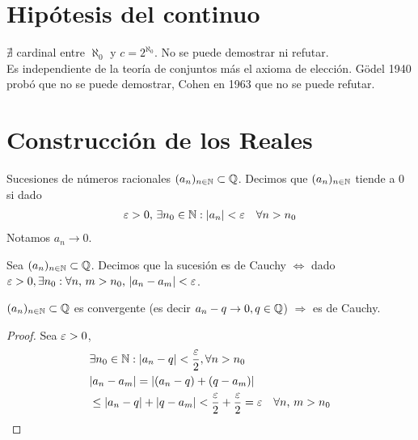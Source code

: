 \section{Hipótesis del continuo}

\(\nexists\) cardinal entre \(\aleph_0\) y \(c = 2^{\aleph_0} \). No se puede demostrar ni refutar. \\
Es independiente de la teoría de conjuntos más el axioma de elección.
Gödel 1940 probó que no se puede demostrar, Cohen en 1963 que no se puede refutar.

\section{Construcción de los Reales}

Sucesiones de números racionales \((a_n)_{n \in \mathbb{N}} \subset \mathbb{Q} \). Decimos que \((a_n)_{n \in \mathbb{N}} \) tiende a 0 si dado \begin{align*}
  \varepsilon > 0\text{, } \exists n_0 \in \mathbb{N} : |a_n| < \varepsilon \quad \forall n > n_0
\end{align*} Notamos \(a_n \to 0\).

\begin{definition}
  Sea \((a_n)_{n \in \mathbb{N}} \subset \mathbb{Q} \). Decimos que la sucesión es de Cauchy \(\iff \) dado \(\varepsilon > 0, \exists n_0 : \forall n\text{, }m > n_0\text{, } |a_n - a_m| < \varepsilon \).
\end{definition}

\begin{theorem}
  \((a_n)_{n \in \mathbb{N}} \subset \mathbb{Q} \) es convergente (es decir \(a_n - q \to 0, q \in \mathbb{Q} \)) \(\Rightarrow \) es de Cauchy.
  \begin{proof}
    Sea \(\varepsilon > 0\),
    \begin{align*}
       & \exists n_0 \in \mathbb{N} : |a_n - q| < \dfrac{\varepsilon}{2}, \forall n > n_0                                 \\
       & | a_n - a_m| = |(a_n - q) + (q - a_m)|                                                          \\
       & \leq |a_n - q| + |q - a_m| < \dfrac{\varepsilon}{2} + \dfrac{\varepsilon}{2} = \varepsilon \quad \forall n\text{, }m > n_0
    \end{align*}
  \end{proof}
\end{theorem}

